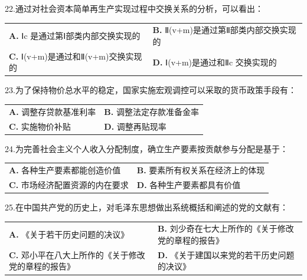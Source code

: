 \documentclass[UTF8,11pt]{ctexart}
\begin{document}
22.通过对社会资本简单再生产实现过程中交换关系的分析，可以看出：


\begin{center}\begin{tabular}{>{\raggedright\arraybackslash}p{\dimexpr(\linewidth-4\tabcolsep)/2\relax}>{\raggedright\arraybackslash}p{\dimexpr(\linewidth-4\tabcolsep)/2\relax}}
\textbf{A.} Ⅰc 是通过第Ⅰ部类内部交换实现的 & \textbf{B.} Ⅱ(v+m)是通过第Ⅱ部类内部交换实现的\\[.35em]
\textbf{C.} Ⅰ(v+m)是通过和Ⅱ(v+m)交换实现的 & \textbf{D.} Ⅰ(v+m)是通过和Ⅱc 交换实现的\\[.35em]\end{tabular}\end{center}

23.为了保持物价总水平的稳定，国家实施宏观调控可以采取的货币政策手段有：


\begin{center}\begin{tabular}{>{\raggedright\arraybackslash}p{\dimexpr(\linewidth-4\tabcolsep)/2\relax}>{\raggedright\arraybackslash}p{\dimexpr(\linewidth-4\tabcolsep)/2\relax}}
\textbf{A.} 调整存贷款基准利率 & \textbf{B.} 调整法定存款准备金率\\[.35em]
\textbf{C.} 实施物价补贴 & \textbf{D.} 调整再贴现率\\[.35em]\end{tabular}\end{center}

24.为完善社会主义个人收入分配制度，确立生产要素按贡献参与分配是基于：


\begin{center}\begin{tabular}{>{\raggedright\arraybackslash}p{\dimexpr(\linewidth-4\tabcolsep)/2\relax}>{\raggedright\arraybackslash}p{\dimexpr(\linewidth-4\tabcolsep)/2\relax}}
\textbf{A.} 各种生产要素都能创造价值 & \textbf{B.} 要素所有权关系在经济上的体现\\[.35em]
\textbf{C.} 市场经济配置资源的内在要求 & \textbf{D.} 各种生产要素都具有价值\\[.35em]\end{tabular}\end{center}

25.在中国共产党的历史上，对毛泽东思想做出系统概括和阐述的党的文献有：


\begin{center}\begin{tabular}{>{\raggedright\arraybackslash}p{\dimexpr(\linewidth-4\tabcolsep)/2\relax}>{\raggedright\arraybackslash}p{\dimexpr(\linewidth-4\tabcolsep)/2\relax}}
\textbf{A.} 《关于若干历史问题的决议》 & \textbf{B.} 刘少奇在七大上所作的《关于修改党的章程的报告》\\[.35em]
\textbf{C.} 邓小平在八大上所作的《关于修改党的章程的报告》 & \textbf{D.} 《关于建国以来党的若干历史问题的决议》\\[.35em]\end{tabular}\end{center}
\end{document}
